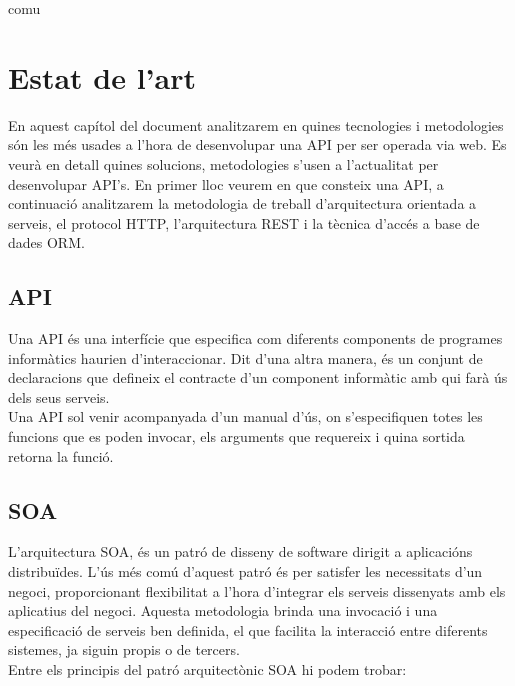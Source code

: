  comu%

\chapter{Estat de l'art}\label{entorn}
En aquest capítol del document analitzarem en quines tecnologies i metodologies són les més usades a l'hora de desenvolupar una \ac{API} per ser operada via web. Es veurà en detall quines solucions, metodologies s'usen a l'actualitat per desenvolupar \ac{API}'s. En primer lloc veurem en que consteix una \ac{API}, a continuació analitzarem la metodologia de treball d'arquitectura orientada a serveis, el protocol \ac{HTTP}, l'arquitectura \ac{REST} i la tècnica d'accés a base de dades \ac{ORM}.
\section{\ac{API}}\label{sec_api}
Una \ac{API} és una interfície que especifica com diferents components de programes informàtics haurien d'interaccionar. Dit d'una altra manera, és un conjunt de declaracions que defineix el contracte d'un component informàtic amb qui farà ús dels seus serveis.\\

Una \ac{API} sol venir acompanyada d'un manual d'ús, on s'especifiquen totes les funcions que es poden invocar, els arguments que requereix i quina sortida retorna la funció.
\section{\ac{SOA}} \label{soa}

L'arquitectura \ac{SOA}, és un patró de disseny de software dirigit a aplicacións distribuïdes. L'ús més comú d'aquest patró és per satisfer les necessitats d'un negoci, proporcionant flexibilitat a l'hora d'integrar els serveis dissenyats amb els aplicatius del negoci. Aquesta metodologia brinda una invocació i una especificació de serveis ben definida, el que facilita la interacció entre diferents sistemes, ja siguin propis o de tercers.\\
\newline
Entre els principis del patró arquitectònic \ac{SOA} hi podem trobar:

